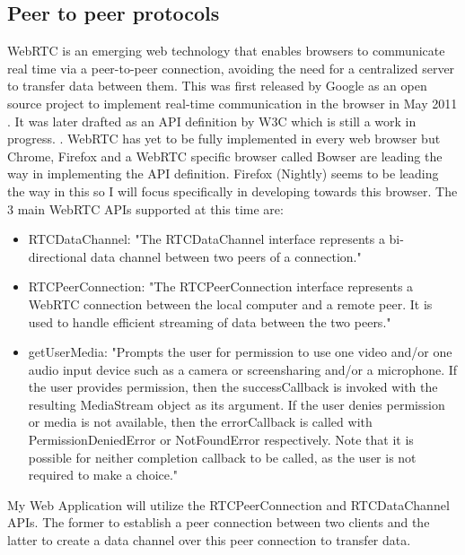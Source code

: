\documentclass[]{report}
\begin{document}
		\subsection*{Peer to peer protocols}
			
			WebRTC is an emerging web technology that enables browsers to communicate real time via a peer-to-peer connection, avoiding the need for a centralized server to transfer data between them. This was first released by Google as an open source project to implement real-time communication in the browser in May 2011 \cite{Google WebRTC Release}. It was later drafted as an API definition by W3C which is still a work in progress. \cite{W3C WebRTC Definition}. WebRTC has yet to be fully implemented in every web browser but Chrome, Firefox and a WebRTC specific browser called Bowser are leading the way in implementing the API definition. Firefox (Nightly) seems to be leading the way in this so I will focus specifically in developing towards this browser\cite{WebRTC browser support}.
			The 3 main WebRTC APIs supported at this time are:
				\begin{itemize}
					\item RTCDataChannel:
					"The RTCDataChannel interface represents a bi-directional data channel between two peers of a connection." \cite{Mozilla Web API} 
					\item RTCPeerConnection:
					"The RTCPeerConnection interface represents a WebRTC connection between the local computer and a remote peer. It is used to handle efficient streaming of data between the two peers." 
					\cite{Mozilla Web API} 
					\item getUserMedia:
					"Prompts the user for permission to use one video and/or one audio input device such as a camera or screensharing and/or a microphone. If the user provides permission, then the successCallback is invoked with the resulting MediaStream object as its argument. If the user denies permission or media is not available, then the errorCallback is called with PermissionDeniedError or NotFoundError respectively. Note that it is possible for neither completion callback to be called, as the user is not required to make a choice."
					\cite{Mozilla Web API} 
				\end{itemize}
			My Web Application will utilize the RTCPeerConnection and RTCDataChannel APIs. The former to establish a peer connection between two clients and the latter to create a data channel over this peer connection to transfer data.
			
\end{document}
